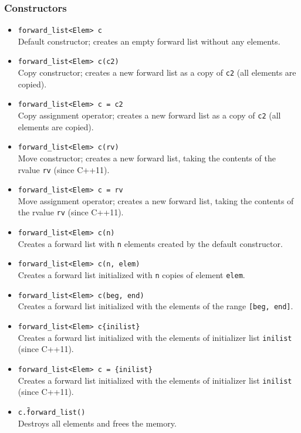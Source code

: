 \documentclass{report}
\begin{document}
   \bigbreak \noindent 
   \subsubsection{Constructors}
   \bigbreak \noindent 
   \bigbreak \noindent 
   \begin{itemize}
    \item \texttt{forward\_list<Elem> c} \\
    Default constructor; creates an empty forward list without any elements.
    
    \item \texttt{forward\_list<Elem> c(c2)} \\
    Copy constructor; creates a new forward list as a copy of \texttt{c2} (all elements are copied).
    
    \item \texttt{forward\_list<Elem> c = c2} \\
    Copy assignment operator; creates a new forward list as a copy of \texttt{c2} (all elements are copied).
    
    \item \texttt{forward\_list<Elem> c(rv)} \\
    Move constructor; creates a new forward list, taking the contents of the rvalue \texttt{rv} (since C++11).
    
    \item \texttt{forward\_list<Elem> c = rv} \\
    Move assignment operator; creates a new forward list, taking the contents of the rvalue \texttt{rv} (since C++11).
    
    \item \texttt{forward\_list<Elem> c(n)} \\
    Creates a forward list with \texttt{n} elements created by the default constructor.
    
    \item \texttt{forward\_list<Elem> c(n, elem)} \\
    Creates a forward list initialized with \texttt{n} copies of element \texttt{elem}.
    
    \item \texttt{forward\_list<Elem> c(beg, end)} \\
    Creates a forward list initialized with the elements of the range \texttt{[beg, end]}.
    
    \item \texttt{forward\_list<Elem> c\{inilist\}} \\
    Creates a forward list initialized with the elements of initializer list \texttt{inilist} (since C++11).
    
    \item \texttt{forward\_list<Elem> c = \{inilist\}} \\
    Creates a forward list initialized with the elements of initializer list \texttt{inilist} (since C++11).
    
    \item \texttt{c.\~forward\_list()} \\
    Destroys all elements and frees the memory.
\end{itemize}
\end{document}
